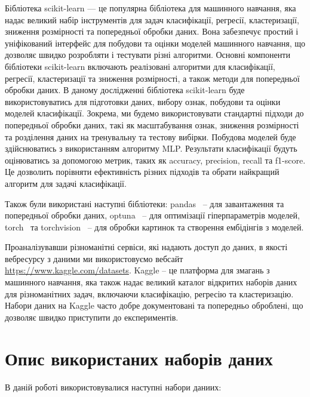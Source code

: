Бібліотека scikit-learn --- це популярна бібліотека для машинного навчання, яка надає великий набір інструментів для задач класифікації, регресії, кластеризації, зниження розмірності та попередньої обробки даних. Вона забезпечує простий і уніфікований інтерфейс для побудови та оцінки моделей машинного навчання, що дозволяє швидко розробляти і тестувати різні алгоритми. Основні компоненти бібліотеки scikit-learn включають реалізовані алгоритми для класифікації, регресії, кластеризації та зниження розмірності, а також методи для попередньої обробки даних. В даному дослідженні бібліотека scikit-learn буде використовуватись для підготовки даних, вибору ознак, побудови та оцінки моделей класифікації. Зокрема, ми будемо використовувати стандартні підходи до попередньої обробки даних, такі як масштабування ознак, зниження розмірності та розділення даних на тренувальну та тестову вибірки. Побудова моделей буде здійснюватись з використанням алгоритму MLP. Результати класифікації будуть оцінюватись за допомогою метрик, таких як accuracy, precision, recall та f1-score. Це дозволить порівняти ефективність різних підходів та обрати найкращий алгоритм для задачі класифікації.

Також були використані наступні бібліотеки: pandas~\cite{ct21} -- для завантаження та попередньої обробки даних, optuna~\cite{ct22} -- для оптимізації гіперпараметрів моделей, torch~\cite{ct23} та torchvision~\cite{ct24} -- для обробки картинок та створення ембідінгів з моделей.

Проаналізувавши різноманітні сервіси, які надають доступ до даних, в якості вебресурсу з даними ми використовуємо вебсайт \href{https://www.kaggle.com/datasets}{https://www.kaggle.com/datasets}. Kaggle -- це платформа для змагань з машинного навчання, яка також надає великий каталог відкритих наборів даних для різноманітних задач, включаючи класифікацію, регресію та кластеризацію. Набори даних на Kaggle часто добре документовані та попередньо оброблені, що дозволяє швидко приступити до експериментів.

\section{Опис використаних наборів даних}

В даній роботі використовувалися наступні набори даниих: 

